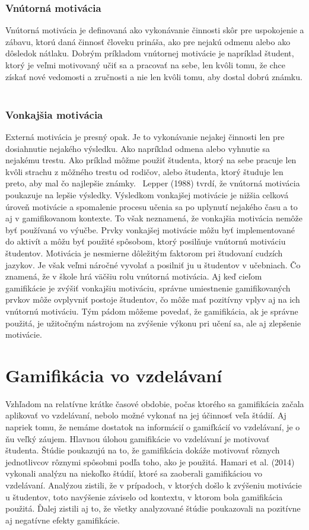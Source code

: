 \documentclass[10pt,oneside,slovak,a4paper]{article}
\begin{document}
\subsubsection{Vnútorná motivácia} \label{vnutorna}
Vnútorná motivácia je definovaná ako vykonávanie činnosti skôr pre uspokojenie a zábavu, ktorú daná činnosť človeku prináša, ako pre nejakú odmenu alebo ako dôsledok nátlaku. Dobrým príkladom vnútornej motivácie je napríklad študent, ktorý je veľmi motivovaný učiť sa a pracovať na sebe, len kvôli tomu, že chce získať nové vedomosti a zručnosti a nie len kvôli tomu, aby dostal dobrú známku. ~\cite{ryan2000intrinsic}

\subsubsection{Vonkajšia motivácia} \label{vonkajsia}
Externá motivácia je presný opak. Je to vykonávanie nejakej činnosti len pre dosiahnutie nejakého výsledku. Ako napríklad odmena alebo vyhnutie sa nejakému trestu. Ako príklad môžme použiť študenta, ktorý na sebe pracuje len kvôli strachu z môžného trestu od rodičov, alebo študenta, ktorý študuje len preto, aby mal čo najlepšie známky.~\cite{ryan2000intrinsic}
Lepper (1988) tvrdí, že vnútorná motivácia poukazuje na lepšie výsledky. Výsledkom vonkajšej motivácie je nižšia celková úroveň motivácie a spomalenie procesu učenia sa po uplynutí nejakého času a to aj v gamifikovanom kontexte. To však neznamená, že vonkajšia motivácia nemôže byť používaná vo výučbe. Prvky vonkajšej motivácie môžu byť implementované do aktivít a môžu byť použité spôsobom, ktorý posilňuje vnútornú motiváciu študentov. Motivácia je nesmierne dôležitým faktorom pri študovaní cudzích jazykov. Je však veľmi náročné vyvolať a posilniť ju u študentov v učebniach. Čo znamená, že v škole hrá väčšiu rolu vnútorná motivácia. Aj keď cieľom gamifikácie je zvýšiť vonkajšiu motiváciu, správne umiestnenie gamifikovaných prvkov môže ovplyvniť postoje študentov, čo môže mať pozitívny vplyv aj na ich vnútornú motiváciu. Tým pádom môžeme povedať, že gamifikácia, ak je správne použitá, je užitočným nástrojom na zvýšenie výkonu pri učení sa, ale aj zlepšenie motivácie. 
~\cite{garland2015gamification}

\section{Gamifikácia vo vzdelávaní}\label{gamificationsection}
Vzhľadom na relatívne krátke časové obdobie, počas ktorého sa gamifikácia začala aplikovať vo vzdelávaní, nebolo možné vykonať na jej účinnosť veľa štúdií. Aj napriek tomu, že nemáme dostatok na informácií o gamifkácií vo vzdelávaní, je o ňu veľký záujem. Hlavnou úlohou gamifikácie vo vzdelávaní je motivovať študenta. Štúdie poukazujú na to, že gamifikácia dokáže motivovať rôznych jednotlivcov rôznymi spôsobmi podľa toho, ako je použitá. Hamari et al. (2014) vykonali analýzu na niekoľko štúdií, ktoré sa zaoberali gamifikáciou vo vzdelávaní. Analýzou zistili, že v prípadoch, v ktorých došlo k zvýšeniu motivácie u študentov, toto navýšenie záviselo od kontextu, v ktorom bola gamifikácia použitá. Ďalej zistili aj to, že všetky analyzované štúdie poukazovali na pozitívne aj negatívne efekty gamifikácie. ~\cite{garland2015gamification}
\end{document}
